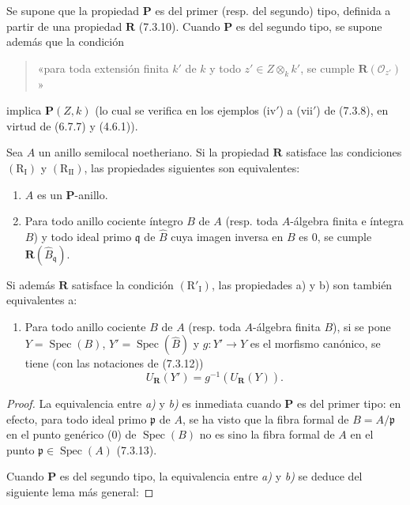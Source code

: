 \begin{proposition}[7.3.16]
\label{IV.2.s7.3.16-fr}
Se supone que la propiedad $\boldsymbol P$ es del primer \textup{(resp.} del
segundo) tipo, definida a partir de una propiedad $\boldsymbol R$
\textup{(7.3.10)}. Cuando $\boldsymbol P$ es del segundo tipo, se supone además
que la condición
\begin{quote}
«para toda extensión \textup{finita} $k'$ de $k$ y todo
$z'\in Z\otimes_k k'$, se cumple
$\boldsymbol R(\mathscr O_{z'})$»
\end{quote}
implica $\boldsymbol P(Z,k)$ \textup{(lo cual se verifica en los ejemplos
(iv$'$) a (vii$'$) de (7.3.8), en virtud de (6.7.7) y (4.6.1))}.

Sea $A$ un anillo semilocal noetheriano. Si la propiedad
$\boldsymbol R$ satisface las condiciones $(\mathrm R_{\mathrm I})$
y $(\mathrm R_{\mathrm{II}})$, las propiedades siguientes son
equivalentes:
\begin{enumerate}
\item[\emph{a)}] $A$ es un $\boldsymbol P$-anillo.
\item[\emph{b)}] Para todo anillo cociente íntegro $B$ de $A$
\textup{(resp.} toda $A$-álgebra finita e íntegra $B$) y todo ideal primo
$\mathfrak q$ de $\widehat B$ cuya imagen inversa en $B$ es 0, se
cumple $\boldsymbol R(\widehat B_{\mathfrak q})$.
\end{enumerate}
Si además $\boldsymbol R$ satisface la condición
$(\mathrm R'_{\mathrm I})$, las propiedades \textup{a)} y \textup{b)} son también
equivalentes a:
\begin{enumerate}
\item[\emph{c)}] Para todo anillo cociente $B$ de $A$ \textup{(resp.} toda
$A$-álgebra finita $B$), si se pone
$Y=\operatorname{Spec}(B)$,
$Y'=\operatorname{Spec}(\widehat B)$ y $g:Y'\to Y$ es el morfismo
canónico, se tiene (con las notaciones de \textup{(7.3.12)})
\begin{equation}
U_{\mathbf{R}}(Y')=g^{-1}(U_{\mathbf{R}}(Y)).
\tag{7.3.16.1}
\label{IV.2.eq.7.3.16.1-fr}
\end{equation}
\end{enumerate}
\end{proposition}

\begin{proof}
La equivalencia entre \emph{a)} y \emph{b)} es inmediata cuando $\boldsymbol P$ es
del primer tipo: en efecto, para todo ideal primo $\mathfrak p$ de
$A$, se ha visto que la fibra formal de $B=A/\mathfrak p$ en el punto
genérico (0) de $\operatorname{Spec}(B)$ no es sino la fibra formal de
$A$ en el punto $\mathfrak p\in\operatorname{Spec}(A)$ (7.3.13).

Cuando $\boldsymbol P$ es del segundo tipo, la equivalencia entre \emph{a)}
y \emph{b)} se deduce del siguiente lema más general:
\end{proof}

